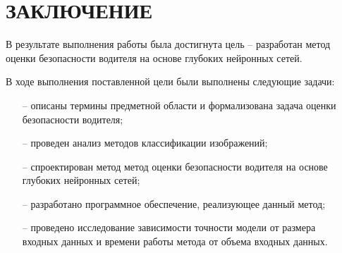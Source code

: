 \section*{ЗАКЛЮЧЕНИЕ}

В результате выполнения работы была достигнута цель -- разработан метод оценки безопасности водителя на основе глубоких нейронных сетей.

В ходе выполнения поставленной цели были выполнены следующие задачи:

\begin{itemize}[leftmargin=1.6\parindent]
	\item[--] описаны термины предметной области и формализована задача оценки безопасности водителя;
	\item[--] проведен анализ методов классификации изображений;
	\item[--] спроектирован метод метод оценки безопасности водителя на основе глубоких нейронных сетей;
	\item[--] разработано программное обеспечение, реализующее данный метод;
	\item[--] проведено исследование зависимости точности модели от размера\\входных данных и времени работы метода от объема входных данных.
\end{itemize}



\pagebreak